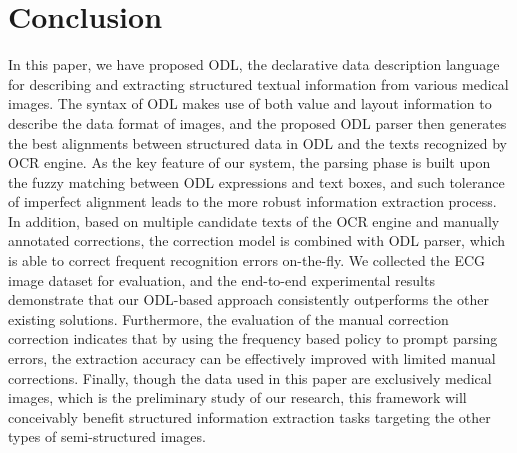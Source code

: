 \section{Conclusion}
\label{sec:conclude}
In this paper, we have proposed ODL, the declarative data description language for
describing and extracting structured textual information
from various medical images.
The syntax of ODL makes use of both value and layout information to describe
the data format of images, and the proposed ODL parser then
generates the best alignments between structured data in ODL
and the texts recognized by OCR engine.
As the key feature of our system, the parsing phase is built upon the
fuzzy matching between ODL expressions and text boxes, and such tolerance of
imperfect alignment leads to the more robust information extraction process.
In addition, based on multiple candidate texts of the OCR engine
and manually annotated corrections,
the correction model is combined with ODL parser,
which is able to correct frequent recognition errors on-the-fly.
We collected the ECG image dataset for evaluation,
and the end-to-end experimental results demonstrate that our ODL-based approach
consistently outperforms the other existing solutions.
Furthermore, the evaluation of the manual correction correction indicates that
by using the frequency based policy to prompt parsing errors,
the extraction accuracy can be effectively improved with limited manual corrections.
Finally, though the data used in this paper are exclusively medical images,
which is the preliminary study of our research,
this framework will conceivably benefit structured information extraction
tasks targeting the other types of semi-structured images.


